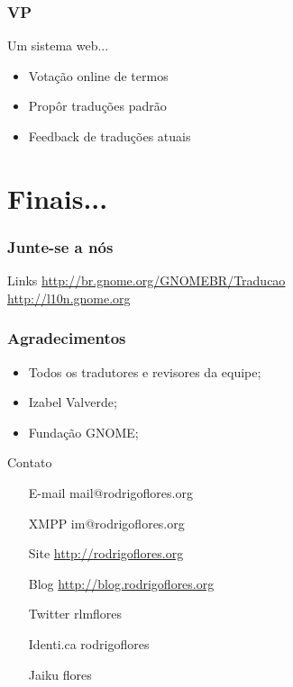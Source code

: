 \documentclass{beamer}
\begin{document}
\begin{frame}
  \frametitle{VP}
  Um sistema web...
  \begin{itemize}
    \item Votação online de termos
    \item Propôr traduções padrão
    \item Feedback de traduções atuais 
  \end{itemize}
\end{frame}

\section{Finais...}

\begin{frame}
  \frametitle{Junte-se a nós}
 
  \begin{block}{Links}
     \url{http://br.gnome.org/GNOMEBR/Traducao}\\
     \url{http://l10n.gnome.org}
  \end{block}
\end{frame}


\begin{frame}
  \frametitle{Agradecimentos}

  \begin{itemize}[<+->]
    \item Todos os tradutores e revisores da equipe;
    \item Izabel Valverde;
    \item Fundação GNOME;     
  \end{itemize}
\end{frame}

\begin{frame}
    \begin{block}{Contato}     
    \begin{itemize}
            \centering
            \item[E-mail] mail@rodrigoflores.org 
            \item[XMPP]  im@rodrigoflores.org        
            \item[Site]  \url{http://rodrigoflores.org}
            \item[Blog]  \url{http://blog.rodrigoflores.org}        
            \item[Twitter] rlmflores 
            \item[Identi.ca] rodrigoflores        
            \item[Jaiku] flores        
        \end{itemize}
    \end{block}
\end{frame}
\end{document}

